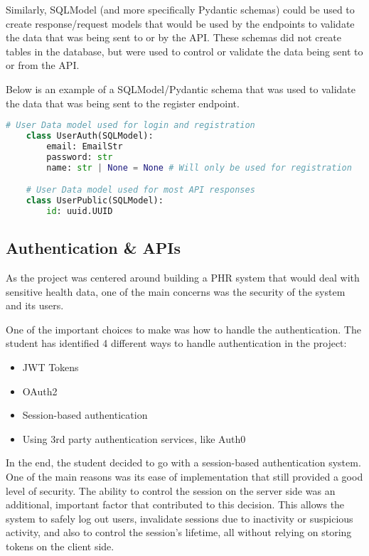 Similarly, SQLModel (and more specifically Pydantic schemas) could be used to create response/request models that would be used by the endpoints to validate the data that was being sent to or by the API. These schemas did not create tables in the database, but were used to control or validate the data being sent to or from the API.

Below is an example of a SQLModel/Pydantic schema that was used to validate the data that was being sent to the register endpoint.

\begin{lstlisting}[language=Python, caption=SQLModel Auth Schema]
    # User Data model used for login and registration
    class UserAuth(SQLModel):
        email: EmailStr
        password: str
        name: str | None = None # Will only be used for registration

    # User Data model used for most API responses
    class UserPublic(SQLModel):
        id: uuid.UUID
\end{lstlisting}

\subsection{Authentication \& APIs}

As the project was centered around building a PHR system that would deal with sensitive health data, one of the main concerns was the security of the system and its users. 

One of the important choices to make was how to handle the authentication. The student has identified 4 different ways to handle authentication in the project:

\begin{itemize}
    \item JWT Tokens
    \item OAuth2
    \item Session-based authentication
    \item Using 3rd party authentication services, like Auth0
\end{itemize}


In the end, the student decided to go with a session-based authentication system. One of the main reasons was its ease of implementation that still provided a good level of security. The ability to control the session on the server side was an additional, important factor that contributed to this decision. This allows the system to safely log out users, invalidate sessions due to inactivity or suspicious activity, and also to control the session's lifetime, all without relying on storing tokens on the client side.

